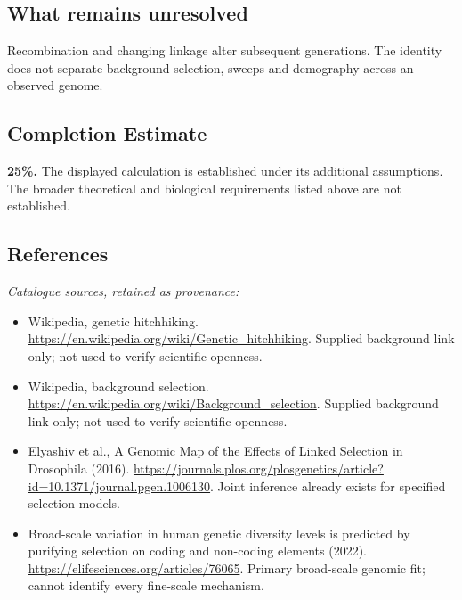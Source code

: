 \documentclass[11pt]{article}
\begin{document}
\subsection{What remains unresolved}
Recombination and changing linkage alter subsequent generations. The identity does not separate background selection, sweeps and demography across an observed genome.
\subsection{Completion Estimate}
\textbf{25\%.} The displayed calculation is established under its additional assumptions. The broader theoretical and biological requirements listed above are not established.
\subsection{References}
\noindent\emph{Catalogue sources, retained as provenance:}
\begin{itemize}
\item Wikipedia, genetic hitchhiking. \url{https://en.wikipedia.org/wiki/Genetic_hitchhiking}. Supplied background link only; not used to verify scientific openness.
\item Wikipedia, background selection. \url{https://en.wikipedia.org/wiki/Background_selection}. Supplied background link only; not used to verify scientific openness.
\item Elyashiv et al., A Genomic Map of the Effects of Linked Selection in Drosophila (2016). \url{https://journals.plos.org/plosgenetics/article?id=10.1371/journal.pgen.1006130}. Joint inference already exists for specified selection models.
\item Broad-scale variation in human genetic diversity levels is predicted by purifying selection on coding and non-coding elements (2022). \url{https://elifesciences.org/articles/76065}. Primary broad-scale genomic fit; cannot identify every fine-scale mechanism.
\end{itemize}
\end{document}
